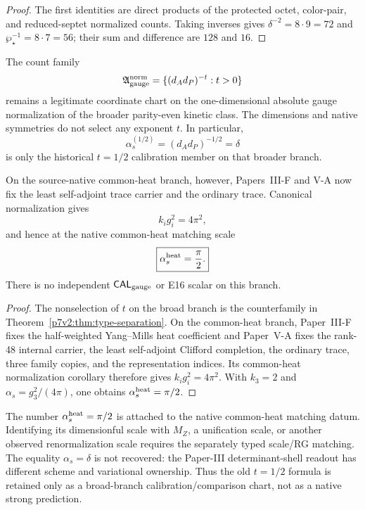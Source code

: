 \documentclass[12pt,a4paper]{article}
\newcommand{\CALgauge}{\mathsf{CAL}_{\rm gauge}}
\begin{document}
\begin{proof}
The first identities are direct products of the protected octet, color-pair,
and reduced-septet normalized counts.  Taking inverses gives
\(\delta^{-2}=8\cdot9=72\) and
\(\wp_\star^{-1}=8\cdot7=56\); their sum and difference are \(128\) and
\(16\).
\end{proof}

\begin{proposition}
\label{p7v2:prop:strong-seed-status}
The count family
\begin{equation}
\label{p7v2:eq:strong-seed-family}
 \mathfrak A_{\rm gauge}^{\rm norm}
 =\{(d_Ad_P)^{-t}:t>0\}
\end{equation}
remains a legitimate coordinate chart on the one-dimensional absolute gauge
normalization of the broader parity-even kinetic class.  The dimensions and
native symmetries do not select any exponent \(t\).  In particular,
\begin{equation}
\label{p7v2:eq:strong-seed-ansatz}
 \alpha_s^{(1/2)}=(d_Ad_P)^{-1/2}=\delta
\end{equation}
is only the historical \(t=1/2\) calibration member on that broader branch.

On the source-native common-heat branch, however, Papers~III-F and V-A now fix
the least self-adjoint trace carrier and the ordinary trace.  Canonical
normalization gives
\[
 \boxed{k_i g_i^2=4\pi^2,}
\]
and hence at the native common-heat matching scale
\[
 \boxed{\alpha_s^{\rm heat}=\frac\pi2.}
\]
There is no independent \(\CALgauge\) or E16 scalar on this branch.
\end{proposition}

\begin{proof}
The nonselection of \(t\) on the broad branch is the counterfamily in
Theorem~\ref{p7v2:thm:type-separation}.  On the common-heat branch,
Paper~III-F fixes the half-weighted Yang--Mills heat coefficient and Paper~V-A
fixes the rank-48 internal carrier, the least self-adjoint Clifford
completion, the ordinary trace, three family copies, and the representation
indices.  Its common-heat normalization corollary therefore gives
\(k_i g_i^2=4\pi^2\).  With \(k_3=2\) and
\(\alpha_s=g_3^2/(4\pi)\), one obtains \(\alpha_s^{\rm heat}=\pi/2\).
\end{proof}

\begin{remark}
The number \(\alpha_s^{\rm heat}=\pi/2\) is attached to the native common-heat
matching datum.  Identifying its dimensionful scale with \(M_Z\), a unification
scale, or another observed renormalization scale requires the separately typed
scale/RG matching.  The equality \(\alpha_s=\delta\) is not recovered: the
Paper-III determinant-shell readout has different scheme and variational
ownership.  Thus the old \(t=1/2\) formula is retained only as a broad-branch
calibration/comparison chart, not as a native strong prediction.
\end{remark}
\end{document}
